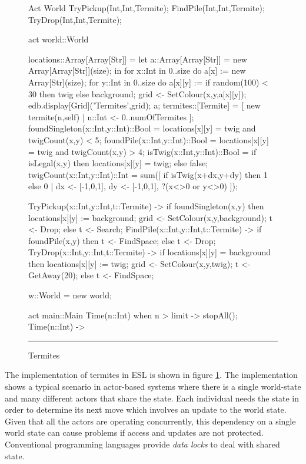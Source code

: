 \documentclass[5p,times]{elsarticle}
\begin{document}
\begin{figure}
\begin{multicols}{2}
\begin{FigESL}
Act World {
  TryPickup(Int,Int,Termite);
  FindPile(Int,Int,Termite);
  TryDrop(Int,Int,Termite);
}

act world::World {
  locations::Array[Array[Str]] =
    let a::Array[Array[Str]] = new Array[Array[Str]](size);
    in {
      for x::Int in 0..size do {
        a[x] := new Array[Str](size);
        for y::Int in 0..size do {
          a[x][y] := if random(100) < 30 
                     then twig 
                     else background;
          grid <- SetColour(x,y,a[x][y]);
        }
      }
      edb.display[Grid]('Termites',grid); 
      a;
    }
  termites::[Termite] = 
    [ new termite(n,self) | n::Int <- 0..numOfTermites ];
  foundSingleton(x::Int,y::Int)::Bool = 
    locations[x][y] = twig and twigCount(x,y) < 5;
  foundPile(x::Int,y::Int)::Bool = 
    locations[x][y] = twig and twigCount(x,y) > 4; 
  isTwig(x::Int,y::Int)::Bool =  
    if isLegal(x,y) 
    then locations[x][y] = twig; 
    else false;
  twigCount(x::Int,y::Int)::Int = 
    sum([ if isTwig(x+dx,y+dy) then 1 else 0 | 
          dx <- [-1,0,1], 
          dy <- [-1,0,1], 
          ?(x<>0 or y<>0) ]);
      
  TryPickup(x::Int,y::Int,t::Termite) -> { 
    if foundSingleton(x,y)
    then {
      locations[x][y] := background;
      grid <- SetColour(x,y,background);
      t <- Drop;
    } else t <- Search;
  }
  FindPile(x::Int,y::Int,t::Termite) -> { 
    if foundPile(x,y)
    then t <- FindSpace;
    else t <- Drop;
  }
  TryDrop(x::Int,y::Int,t::Termite) -> {
    if locations[x][y] = background
    then {
      locations[x][y] := twig;
      grid <- SetColour(x,y,twig);
      t <- GetAway(20);
    } else t <- FindSpace;
  }
}

w::World = new world;

act main::Main {
  Time(n::Int) when n > limit -> stopAll();
  Time(n::Int) -> { } 
}
\end{FigESL}
\end{multicols}
\hrule\textwidth1cm\vspace{.5cm}
\caption{Termites}
\label{fig:esl_termites}
\end{figure}

The implementation of termites in ESL is shown in figure \ref{fig:esl_termites}. The implementation shows a typical scenario in actor-based systems where there is a single world-state and many different actors that share the state. Each individual needs the state in order to determine its next move which involves an update to the world state. Given that all the actors are operating concurrently, this dependency on a single world state can cause problems if access and updates are not protected. Conventional programming languages provide {\it data locks} to deal with shared state. 
\end{document}
